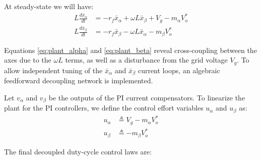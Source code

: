 \documentclass[DIV=calc, paper=a4, fontsize=11pt, twocolumn]{scrartcl}	 %
\begin{document}
At steady-state we will have:
\begin{subequations}\begin{align}
    L \frac{d\bar{x}_\alpha}{dt} &= -r_f \bar{x}_\alpha + \omega L \bar{x}_\beta + V_g - m_\alpha V_o^* \label{eq:plant_alpha} \\
    L \frac{d\bar{x}_\beta}{dt} &= -r_f \bar{x}_\beta - \omega L \bar{x}_\alpha - m_\beta V_o^* \label{eq:plant_beta}
\end{align}\end{subequations}



Equations \eqref{eq:plant_alpha} and \eqref{eq:plant_beta} reveal cross-coupling between the axes due to the $\omega L$ terms, as well as a disturbance from the grid voltage $V_g$. To allow independent tuning of the $\bar{x}_\alpha$ and $\bar{x}_\beta$ current loops, an algebraic feedforward decoupling network is implemented. 

Let $v_\alpha$ and $v_\beta$ be the outputs of the PI current compensators. To linearize the plant for the PI controllers, we define the control effort variables $u_\alpha$ and $u_\beta$ as:
\begin{subequations}\begin{align}
    u_\alpha &\triangleq V_g - m_\alpha V_o^* \\  u_\beta &\triangleq -m_\beta V_o^*
\end{align}\end{subequations}

The final decoupled duty-cycle control laws are:
\end{document}
